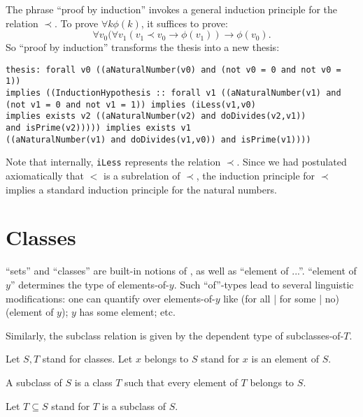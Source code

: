 \documentclass[11pt]{article}
\begin{document}
The phrase ``proof by induction'' invokes a general induction principle
for the relation $\prec$. To prove $\forall k \phi(k)$, it suffices to
prove:
$$\forall v_0 (\forall v_1 (v_1 \prec v_0 \rightarrow \phi(v_1))
\rightarrow \phi(v_0).$$
So ``proof by induction'' transforms the thesis into a new thesis:
\begin{footnotesize}
\begin{verbatim}
thesis: forall v0 ((aNaturalNumber(v0) and (not v0 = 0 and not v0 = 1))
implies ((InductionHypothesis :: forall v1 ((aNaturalNumber(v1) and
(not v1 = 0 and not v1 = 1)) implies (iLess(v1,v0)
implies exists v2 ((aNaturalNumber(v2) and doDivides(v2,v1))
and isPrime(v2))))) implies exists v1
((aNaturalNumber(v1) and doDivides(v1,v0)) and isPrime(v1))))
\end{verbatim}
\end{footnotesize}
Note that internally,
\verb+iLess+ represents the relation $\prec$. Since we had postulated
axiomatically that $<$ is a subrelation of $\prec$, the induction principle
for $\prec$ implies a standard induction principle for the natural numbers.

\section{Classes}

``sets'' and ``classes'' are built-in notions of
\Naproche, as well as ``element of ...''.
``element of
$y$'' determines the type of
elements-of-$y$. Such ``of''-types lead to several
linguistic modifications: one can quantify over
elements-of-$y$ like (for all | for some | no) (element of $y$);
$y$ has some element; etc.

Similarly, the subclass relation is given by the dependent
type of subclasses-of-$T$.

\begin{forthel}

Let $S,T$ stand for classes.
Let $x$ belongs to $S$ stand
for $x$ is an element of $S$.

\begin{definition} A subclass of $S$ is a class $T$
such that every element of $T$ belongs to $S$.
\end{definition}

Let $T \subseteq S$ stand for $T$ is a subclass of $S$.
\end{forthel}
\end{document}
